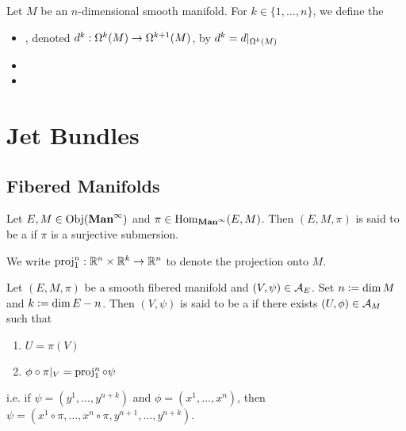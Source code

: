 \documentclass{book}
\begin{document}
\begin{defn}
	Let $M$ be an $n$-dimensional smooth manifold. For $k \in  \{1, \ldots, n\}$, we define the
	\begin{itemize}
		 \item {}, denoted $d^k: \Omega^k(M) \rightarrow \Omega^{k+1}(M)$, by $d^k = d|_{\Omega^k(M)}$
		 \item 
		 \item 
	\end{itemize} 
\end{defn}

































\chapter{Jet Bundles}

\section{Fibered Manifolds}

\begin{defn}
	Let $E, M \in \operatorname{Obj}(\operatorname*{\text{\textbf{Man}}^{\infty}})$ and $\pi \in \operatorname{Hom}_{\operatorname*{\text{\textbf{Man}}^{\infty}}}(E, M)$. Then $(E, M, \pi)$ is said to be a  if $\pi$ is a surjective submersion. 
\end{defn}

\begin{note}
	We write $\operatorname{\text{proj}}^n_1: \mathbb{R}^n \times \mathbb{R}^k \rightarrow \mathbb{R}^n$ to denote the projection onto $M$.
\end{note}

\begin{defn}
	Let $(E, M, \pi)$ be a smooth fibered manifold and $(V, \psi) \in \mathcal{A}_{E}$. Set $n \vcentcolon= \dim M$ and $k \vcentcolon= \dim E - n$. Then $(V, \psi)$ is said to be a  if there exists $(U, \phi) \in \mathcal{A}_{M}$ such that 
	\begin{enumerate}
		\item $U = \pi(V)$
		\item $\phi \circ \pi|_V = \operatorname{\text{proj}}^n_1 \circ \psi$
	\end{enumerate}
	i.e. if $\psi = (y^1, \ldots, y^{n+k})$ and $\phi = (x^1, \ldots, x^n)$, then $\psi = (x^1 \circ \pi, \ldots, x^n \circ \pi, y^{n+1}, \ldots, y^{n+k})$.
\end{defn}
\end{document}
